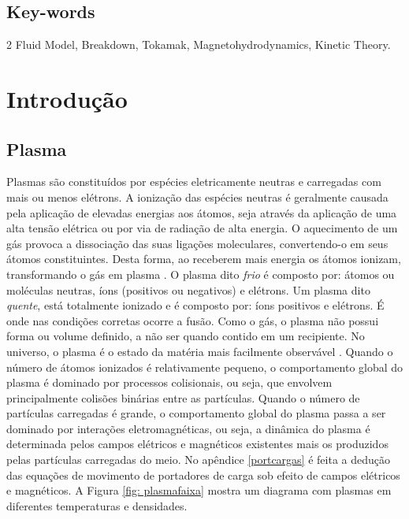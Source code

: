 \documentclass[12pt,oneside,a4paper]{abntex2}
\begin{document}
\section*{Key-words}
2 Fluid Model, Breakdown, Tokamak, Magnetohydrodynamics, Kinetic Theory.

\chapter{Introdução} 

\section{Plasma}

\noindent Plasmas são constituídos por espécies eletricamente neutras e carregadas com mais ou menos elétrons. 
A ionização das espécies neutras é geralmente causada pela aplicação de elevadas energias aos átomos, seja através da aplicação de uma alta tensão elétrica ou por via de radiação de alta energia.
O aquecimento de um gás provoca a dissociação das suas ligações moleculares, convertendo-o em seus átomos constituintes. 
Desta forma, ao receberem mais energia os átomos ionizam, transformando o gás em plasma \cite{tokamaks}.
O plasma dito \textit{frio} é composto por: átomos ou moléculas neutras, íons (positivos ou negativos) e elétrons. Um plasma dito \textit{quente}, está totalmente ionizado e é composto por: íons positivos e elétrons. É onde nas condições corretas ocorre a fusão. Como o gás, o plasma não possui forma ou volume definido, a não ser quando contido em um recipiente. No universo, o plasma é o estado da matéria mais facilmente observável \cite{MagneticControl}.
Quando o número de átomos ionizados é relativamente pequeno, o comportamento global do plasma é dominado por processos colisionais, ou seja, que envolvem principalmente colisões binárias entre as partículas. 
Quando o número de partículas carregadas é grande, o comportamento global do plasma passa a ser dominado por interações eletromagnéticas, ou seja, a dinâmica do plasma é determinada pelos campos elétricos e magnéticos existentes mais os produzidos pelas partículas carregadas do meio. 
No apêndice \ref{portcargas} é feita a dedução das equações de movimento de portadores de carga sob efeito de campos elétricos e magnéticos. A Figura \ref{fig: plasmafaixa} mostra um diagrama com plasmas em diferentes temperaturas e densidades.  
\end{document}

